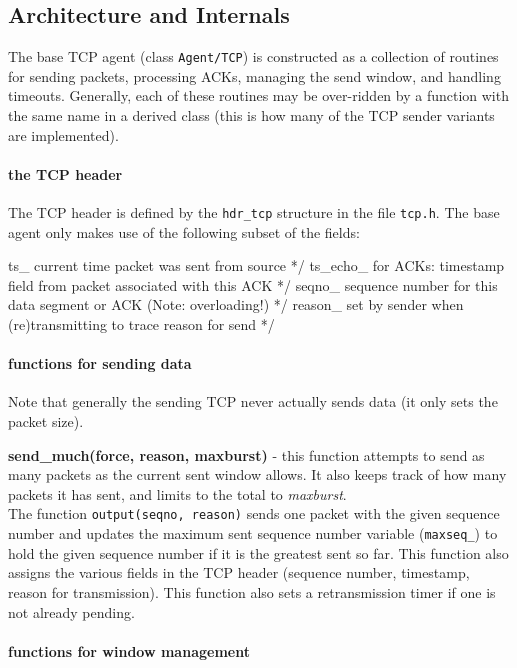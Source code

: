 \documentclass{article}
\begin{document}
\subsection{Architecture and Internals}
\label{sec:tcparchitecture}

The base TCP agent (class {\tt Agent/TCP}) is constructed
as a collection of routines for sending packets, processing ACKs,
managing the send window, and handling timeouts.
Generally, each of these routines may be over-ridden by a
function with the same name in a derived class (this is how
many of the TCP sender variants are implemented).

\paragraph{the TCP header}
The TCP header is defined by the {\tt hdr\_tcp} structure
in the file {\tt tcp.h}.
The base agent only makes use of the following subset of the fields:
\begin{program}
ts_	\* current time packet was sent from source */
ts_echo_ \* for ACKs: timestamp field from packet associated with this ACK */
seqno_ \* sequence number for this data segment or ACK (Note: overloading!) */
reason_ \* set by sender when (re)transmitting to trace reason for send */
\end{program}

\paragraph{functions for sending data}
Note that generally the sending TCP never actually sends
data (it only sets the packet size).

{\bf send\_much(force, reason, maxburst)} - this function
attempts to send as many packets as the current sent window allows.
It also keeps track of how many packets it has sent, and limits to the
total to {\em maxburst}. \\
The function {\tt output(seqno, reason)} sends one packet
with the given sequence number and updates the maximum sent sequence
number variable ({\tt maxseq\_}) to hold the given sequence number if
it is the greatest sent so far.
This function also assigns the various fields in the TCP
header (sequence number, timestamp, reason for transmission).
This function also sets a retransmission timer if one is not already
pending.

\paragraph{functions for window management}
\end{document}
